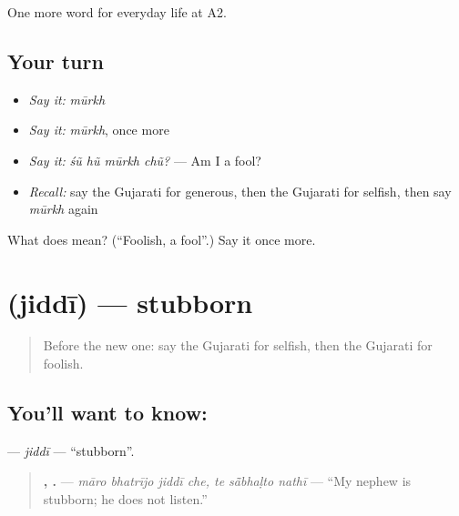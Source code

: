 \begin{grammarlens}[title={What you've built}]
One more word for everyday life at A2.
\end{grammarlens}

\subsection*{Your turn}
\begin{itemize}
\raggedright
  \item \emph{Say it:} \emph{mūrkh}
  \item \emph{Say it:} \emph{mūrkh}, once more
  \item \emph{Say it:} \emph{śũ hũ mūrkh chũ?} — Am I a fool?
  \item \emph{Recall:} say the Gujarati for generous, then the Gujarati for selfish, then say \emph{mūrkh} again
\end{itemize}

\begin{tcolorbox}[breakable,colback=teal!4,colframe=teal!35!black,title={Before you move on}]
What does  mean? (\textquotedblleft{}Foolish, a fool\textquotedblright{}.) Say it once more.
\end{tcolorbox}
\section[\texorpdfstring{\gu{જિદ્દી} (jiddī)}{જિદ્દી (jiddī)}]{ (jiddī) — stubborn}

\label{lesson:GU-C271-jiddi}



\begin{quote}
Before the new one: say the Gujarati for selfish, then the Gujarati for foolish.
\end{quote}

\subsection*{You'll want to know: }
\textbf{} — \emph{jiddī} — \textquotedblleft{}stubborn\textquotedblright{}.

\begin{quote}
\textbf{   ,   .} — \emph{māro bhatrījo jiddī che, te sā̃bhaḷto nathī} — \textquotedblleft{}My nephew is stubborn; he does not listen.\textquotedblright{}
\end{quote}

